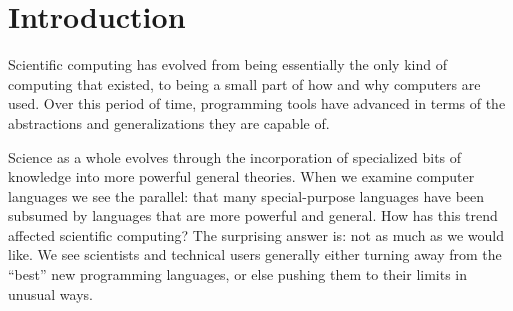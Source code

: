 \chapter{Introduction}

Scientific computing has evolved from being essentially the only kind of
computing that existed, to being a small part of how and why computers
are used.
Over this period of time, programming tools have advanced in terms of
the abstractions and generalizations they are capable of.

Science as a whole evolves through the incorporation of specialized bits
of knowledge into more powerful general theories.  
When we examine computer languages we see the parallel:  that
many special-purpose languages have been subsumed by languages that are more powerful and
general. 
How has this trend affected scientific computing?
The surprising answer is: not as much as we would like.
We see scientists and technical users generally either turning away
from the ``best'' new programming languages, or else pushing them
to their limits in unusual ways.


